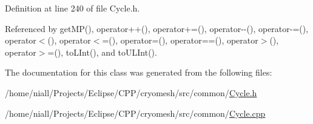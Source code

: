\-Definition at line 240 of file \-Cycle.\-h.



\-Referenced by get\-M\-P(), operator++(), operator+=(), operator-\/-\/(), operator-\/=(), operator$<$(), operator$<$=(), operator=(), operator==(), operator$>$(), operator$>$=(), to\-L\-Int(), and to\-U\-L\-Int().



\-The documentation for this class was generated from the following files\-:\begin{DoxyCompactItemize}
\item 
/home/niall/\-Projects/\-Eclipse/\-C\-P\-P/cryomesh/src/common/\hyperlink{Cycle_8h}{\-Cycle.\-h}\item 
/home/niall/\-Projects/\-Eclipse/\-C\-P\-P/cryomesh/src/common/\hyperlink{Cycle_8cpp}{\-Cycle.\-cpp}\end{DoxyCompactItemize}
